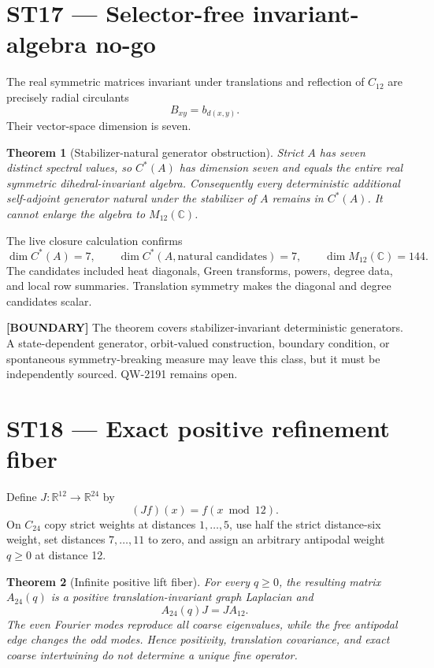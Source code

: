 \documentclass[11pt,a4paper]{article}
\newtheorem{theorem}{Theorem}[section]
\newcommand{\boundary}{\textcolor{orange!80!black}{\textbf{[BOUNDARY]}}}
\begin{document}
\section{ST17 --- Selector-free invariant-algebra no-go}

The real symmetric matrices invariant under translations and reflection of $C_{12}$ are precisely radial circulants
\[
B_{xy}=b_{d(x,y)}.
\]
Their vector-space dimension is seven.

\begin{theorem}[Stabilizer-natural generator obstruction]
Strict $A$ has seven distinct spectral values, so $C^*(A)$ has dimension seven and equals the entire real symmetric dihedral-invariant algebra. Consequently every deterministic additional self-adjoint generator natural under the stabilizer of $A$ remains in $C^*(A)$. It cannot enlarge the algebra to $M_{12}(\mathbb C)$.
\end{theorem}

The live closure calculation confirms
\[
\dim C^*(A)=7,\qquad
\dim C^*(A,\text{natural candidates})=7,\qquad
\dim M_{12}(\mathbb C)=144.
\]
The candidates included heat diagonals, Green transforms, powers, degree data, and local row summaries. Translation symmetry makes the diagonal and degree candidates scalar.

\boundary{} The theorem covers stabilizer-invariant deterministic generators. A state-dependent generator, orbit-valued construction, boundary condition, or spontaneous symmetry-breaking measure may leave this class, but it must be independently sourced. QW-2191 remains open.

\section{ST18 --- Exact positive refinement fiber}

Define $J:\mathbb R^{12}\to\mathbb R^{24}$ by
\[
(Jf)(x)=f(x\bmod12).
\]
On $C_{24}$ copy strict weights at distances $1,\ldots,5$, use half the strict distance-six weight, set distances $7,\ldots,11$ to zero, and assign an arbitrary antipodal weight $q\ge0$ at distance 12.

\begin{theorem}[Infinite positive lift fiber]
For every $q\ge0$, the resulting matrix $A_{24}(q)$ is a positive translation-invariant graph Laplacian and
\[
A_{24}(q)J=JA_{12}.
\]
The even Fourier modes reproduce all coarse eigenvalues, while the free antipodal edge changes the odd modes. Hence positivity, translation covariance, and exact coarse intertwining do not determine a unique fine operator.
\end{theorem}
\end{document}
